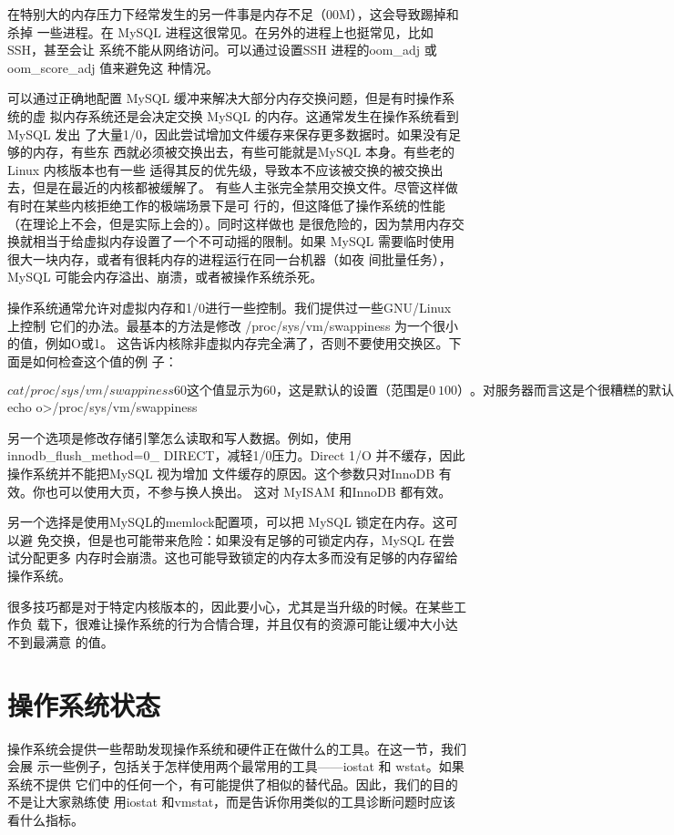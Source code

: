 在特别大的内存压力下经常发生的另一件事是内存不足（00M），这会导致踢掉和杀掉
一些进程。在 MySQL 进程这很常见。在另外的进程上也挺常见，比如SSH，甚至会让
系统不能从网络访问。可以通过设置SSH 进程的oom\_adj 或oom\_score\_adj 值来避免这
种情况。

可以通过正确地配置 MySQL 缓冲来解决大部分内存交换问题，但是有时操作系统的虚
拟内存系统还是会决定交换 MySQL 的内存。这通常发生在操作系统看到MySQL 发出
了大量1/0，因此尝试增加文件缓存来保存更多数据时。如果没有足够的内存，有些东
西就必须被交换出去，有些可能就是MySQL 本身。有些老的Linux 内核版本也有一些
适得其反的优先级，导致本不应该被交换的被交换出去，但是在最近的内核都被缓解了。
有些人主张完全禁用交换文件。尽管这样做有时在某些内核拒绝工作的极端场景下是可
行的，但这降低了操作系统的性能（在理论上不会，但是实际上会的）。同时这样做也
是很危险的，因为禁用内存交换就相当于给虚拟内存设置了一个不可动摇的限制。如果
MySQL 需要临时使用很大一块内存，或者有很耗内存的进程运行在同一台机器（如夜
间批量任务），MySQL 可能会内存溢出、崩溃，或者被操作系统杀死。

操作系统通常允许对虚拟内存和1/0进行一些控制。我们提供过一些GNU/Linux 上控制
它们的办法。最基本的方法是修改 /proc/sys/vm/swappiness 为一个很小的值，例如O或1。
这告诉内核除非虚拟内存完全满了，否则不要使用交换区。下面是如何检查这个值的例
子：

$ cat /proc/sys/vm/swappiness

60

这个值显示为60，这是默认的设置（范围是0~100）。对服务器而言这是个很糟糕的
默认值。这个值只对笔记本适用。服务器应该设置0：

$ echo o>/proc/sys/vm/swappiness

另一个选项是修改存储引擎怎么读取和写人数据。例如，使用 innodb\_flush\_method=0\_
DIRECT，减轻1/0压力。Direct 1/O 并不缓存，因此操作系统并不能把MySQL 视为增加
文件缓存的原因。这个参数只对InnoDB 有效。你也可以使用大页，不参与换人换出。
这对 MyISAM 和InnoDB 都有效。

另一个选择是使用MySQL的memlock配置项，可以把 MySQL 锁定在内存。这可以避
免交换，但是也可能带来危险：如果没有足够的可锁定内存，MySQL 在尝试分配更多
内存时会崩溃。这也可能导致锁定的内存太多而没有足够的内存留给操作系统。

很多技巧都是对于特定内核版本的，因此要小心，尤其是当升级的时候。在某些工作负
载下，很难让操作系统的行为合情合理，并且仅有的资源可能让缓冲大小达不到最满意
的值。

\section{操作系统状态}
操作系统会提供一些帮助发现操作系统和硬件正在做什么的工具。在这一节，我们会展
示一些例子，包括关于怎样使用两个最常用的工具——iostat 和 wstat。如果系统不提供
它们中的任何一个，有可能提供了相似的替代品。因此，我们的目的不是让大家熟练使
用iostat 和vmstat，而是告诉你用类似的工具诊断问题时应该看什么指标。

